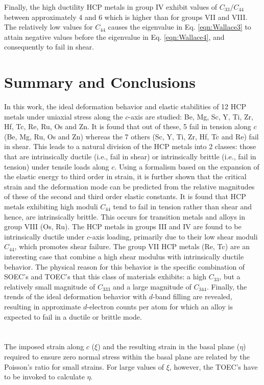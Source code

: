 \documentclass[showpacs,aps,floatfix,prb,reprint,superscriptaddress]{revtex4-1}
\begin{document}
Finally, the high ductility HCP metals in group IV exhibit values of $C_{33}/C_{44}$ between approximately 4 and 6 which is higher than for groups VII and VIII. The relatively low values for $C_{44}$ causes the eigenvalue in Eq. \ref{eqn:Wallace3} to attain negative values before the eigenvalue in Eq. \ref{eqn:Wallace4}, and consequently to fail in shear.

\section{Summary and Conclusions}
In this work, the ideal deformation behavior and elastic stabilities of 12 HCP metals under uniaxial stress along the $c$-axis are studied: Be, Mg, Sc, Y, Ti, Zr, Hf, Tc, Re, Ru, Os and Zn. It is found that out of these, 5 fail in tension along $c$ (Be, Mg, Ru, Os and Zn) whereas the 7 others (Sc, Y, Ti, Zr, Hf, Tc and Re) fail in shear. This leads to a natural division of the HCP metals into 2 classes: those that are intrinsically ductile (i.e., fail in shear) or intrinsically brittle (i.e., fail in tension) under tensile loads along $c$. Using a formalism based on the expansion of the elastic energy to third order in strain, it is further shown that the critical strain and the deformation mode can be predicted from the relative magnitudes of these  of the second and third order elastic constants.  It is found that HCP metals exhibiting high moduli $C_{44}$ tend to fail in tension rather than shear and hence, are intrinsically brittle. This occurs for transition metals and alloys in group VIII (Os, Ru). The HCP metals in groups III and IV are found to be intrinsically ductile under $c$-axis loading, primarily due to their low shear moduli $C_{44}$, which promotes shear failure. The group VII HCP metals (Re, Tc) are an interesting case that combine a high shear modulus with intrinsically ductile behavior. The physical reason for this behavior is the specific combination of SOEC's and TOEC's that this class of materials exhibits: a high $C_{33}$, but a relatively small magnitude of $C_{333}$ and a large magnitude of $C_{344}$. Finally, the trends of the ideal deformation behavior with $d$-band filling are revealed, resulting in approximate $d$-electron counts per atom for which an alloy is expected to fail in a ductile or brittle mode.

\appendix
\section{}
The imposed strain along $c$ ($\xi$) and the resulting strain in the basal plane ($\eta$) required to ensure zero normal stress within the basal plane are related by the Poisson's ratio for small strains. For large values of $\xi$, however, the TOEC's have to be invoked to calculate $\eta$.
\end{document}
